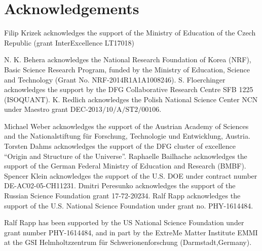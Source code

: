 \section*{Acknowledgements}


Filip Krizek acknowledges the support of the Ministry of Education of the Czech Republic (grant InterExcellence LT17018)

N. K. Behera acknowledges the National Research Foundation of Korea (NRF), Basic Science Research Program, funded by the Ministry of Education, Science and Technology (Grant No. NRF-2014R1A1A1008246).
S. Floerchinger acknowledges the support by the DFG Collaborative Research Centre SFB 1225 (ISOQUANT). 
K. Redlich acknowledges the Polish National Science Center NCN under Maestro grant DEC-$\mathrm{2013/10/A/ST2/00106}$. 

Michael Weber acknowledges the support of the Austrian Academy of Sciences and the Nationalstiftung f\"ur Forschung, Technologie und Entwicklung, Austria.
Torsten Dahms acknowledges the support of the DFG cluster of excellence ``Origin and Structure of the Universe''. 
Raphaelle Bailhache acknowledges the support of the German Federal Ministry of Education and Research (BMBF).
Spencer Klein acknowledges the support of the U.S. DOE under contract number DE-AC02-05-CH11231.
Dmitri Peresunko acknowledges the support of the Russian Science Foundation grant 17-72-20234.
Ralf Rapp acknowledges the support of the U.S. National Science Foundation under
grant no. PHY-1614484.

Ralf Rapp has been supported by the US National Science Foundation under
grant number PHY-1614484, and in part by the ExtreMe Matter Institute EMMI at 
the GSI Helmholtzzentrum f\"{u}r Schwerionenforschung (Darmstadt,Germany).
